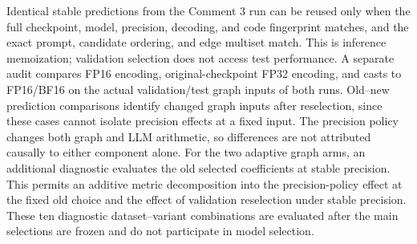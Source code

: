 Identical stable predictions from the Comment 3 run can be reused only when the
full checkpoint, model, precision, decoding, and code fingerprint matches, and
the exact prompt, candidate ordering, and edge multiset match. This is inference
memoization; validation selection does not access test performance. A separate
audit compares FP16 encoding, original-checkpoint FP32 encoding, and casts to
FP16/BF16 on the actual validation/test graph inputs of both runs. Old--new
prediction comparisons identify changed graph inputs after reselection, since
these cases cannot isolate precision effects at a fixed input. The precision
policy changes both graph and LLM arithmetic, so differences are not attributed
causally to either component alone.
For the two adaptive graph arms, an additional diagnostic evaluates the old
selected coefficients at stable precision. This permits an additive metric
decomposition into the precision-policy effect at the fixed old choice and the
effect of validation reselection under stable precision. These ten diagnostic
dataset--variant combinations are evaluated after the main selections are
frozen and do not participate in model selection.
